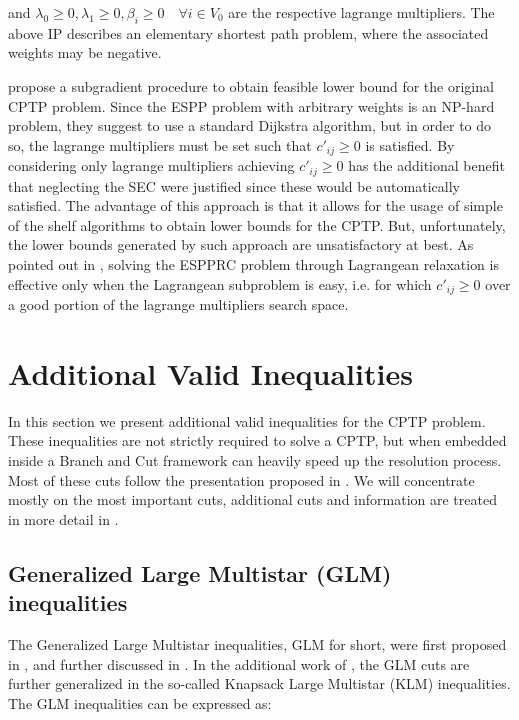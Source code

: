 and $\lambda_0 \ge 0, \lambda_1 \ge 0, \beta_i \ge 0 \quad \forall i \in V_0$ are the respective lagrange multipliers.
The above IP describes an elementary shortest path problem, where the associated weights may be negative.

\cite{beasley1989algorithm} propose a subgradient procedure to obtain feasible lower bound for the original CPTP problem.
Since the ESPP problem with arbitrary weights is an NP-hard problem, they suggest to use a standard Dijkstra algorithm, but in order to do so, the lagrange multipliers must be set such that $c'_{ij} \ge 0$ is satisfied.
By considering only lagrange multipliers achieving $c'_{ij} \ge 0$ has the additional benefit that neglecting the SEC were justified since these would be automatically satisfied.
The advantage of this approach is that it allows for the usage of simple of the shelf algorithms to obtain lower bounds for the CPTP.
But, unfortunately, the lower bounds generated by such approach are unsatisfactory at best.
As pointed out in \cite{righini2004dynamic}, solving the ESPPRC problem through Lagrangean relaxation is effective only when the Lagrangean subproblem is easy, i.e. for which $c'_{ij} \ge 0$ over a good portion of the lagrange multipliers search space.


\section{Additional Valid Inequalities}\label{sec:additional-valid-inequalities}

In this section we present additional valid inequalities for the CPTP problem.
These inequalities are not strictly required to solve a CPTP, but when embedded inside a Branch and Cut framework can heavily speed up the resolution process.
Most of these cuts follow the presentation proposed in \cite{Jepsen2014}.
We will concentrate mostly on the most important cuts, additional cuts and information are treated in more detail in \cite{Jepsen2014}.

\subsection{Generalized Large Multistar (GLM) inequalities}
The Generalized Large Multistar inequalities, GLM for short, were first proposed in \cite{gouveia_result_1995}, and further discussed in \cite{letchford2006projection}.
In the additional work of \cite{letchford_multistars_2002}, the GLM cuts are further generalized in the so-called Knapsack Large Multistar (KLM) inequalities.
The GLM inequalities can be expressed as:

